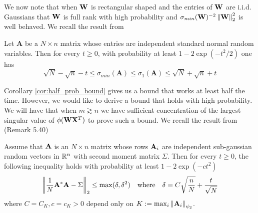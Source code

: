\par
We now note that when $\mathbf{W}$ is rectangular shaped and the entries of $\mathbf{W}$ are i.i.d. Gaussians that $\mathbf{W}$ is full rank with high probability and $\sigma_{min}(\mathbf{W})^{-2} \left\lVert\mathbf{W}\right\rVert_2^2$ is well behaved.  We recall the result from \cite{vershynin2011introduction}
\begin{theorem}\label{thm:gauss_well_cond}
Let $\mathbf{A}$ be a $N \times n$ matrix whose entries are independent standard normal random variables.  Then for every $t \geq 0$, with probability at least $1 - 2 \exp(-t^2 /2)$ one has
\[ \sqrt{N} - \sqrt{n} - t \leq \sigma_{min}(\mathbf{A}) \leq \sigma_{1}(\mathbf{A}) \leq \sqrt{N} + \sqrt{n} + t \]
\end{theorem}


\par
Corollary \ref{cor:half_prob_bound} gives us a bound that works at least half the time.  However, we would like to derive a bound that holds with high probability.  We will have that when $m \gtrsim n$ we have sufficient concentration of the largest singular value of $\phi(\mathbf{W} \mathbf{X}^T)$ to prove such a bound.  We recall the result from \cite{vershynin2011introduction} (Remark 5.40)
\begin{theorem}\label{thm:versh_mat_conc}
Assume that $\mathbf{A}$ is an $N \times n$ matrix whose rows $\mathbf{A}_i$ are independent sub-gaussian random vectors in $\mathbb{R}^n$ with second moment matrix $\Sigma$.  Then for every $t \geq 0$, the following inequality holds with probability at least $1 - 2\exp(-ct^2)$
\[ \left\lVert\frac{1}{N} \mathbf{A}^* \mathbf{A} - \Sigma\right\rVert_2 \leq \max(\delta, \delta^2) \quad \text{where} \quad \delta = C \sqrt{\frac{n}{N}} + \frac{t}{\sqrt{N}} \]
where $C = C_K, c = c_K > 0$ depend only on $K := \max_{i} \left\lVert\mathbf{A}_i\right\rVert_{\psi_2}$.
\end{theorem}

